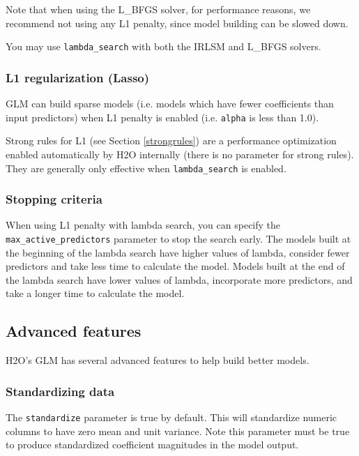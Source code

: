 Note that when using the L\_BFGS solver, for performance reasons, we recommend not using any L1 penalty, since
model building can be slowed down.

You may use \texttt{lambda\_search} with both the IRLSM and L\_BFGS solvers.

\subsubsection{L1 regularization (Lasso)}

GLM can build sparse models (i.e. models which have fewer coefficients than input predictors) when L1 penalty is
enabled (i.e. \texttt{alpha} is less than 1.0).

Strong rules for L1 (see Section \ref{strongrules}) are a performance optimization enabled automatically by H2O
internally (there is no parameter for strong rules).  They are generally only effective when
\texttt{lambda\_search} is enabled.

\subsubsection{Stopping criteria}

When using L1 penalty with lambda search, you can specify the \texttt{max\_active\_predictors} parameter to stop
the search early.  The models built at the beginning of the lambda search have higher values of lambda, consider
fewer predictors and take less time to calculate the model.  Models built at the end of the lambda search have
lower values of lambda, incorporate more predictors, and take a longer time to calculate the model.

\bigskip
\waterExampleInR


\subsection{Advanced features}

H2O's GLM has several advanced features to help build better models.

\subsubsection{Standardizing data}

The \texttt{standardize} parameter is true by default.  This will standardize numeric columns to have zero mean and
unit variance.  Note this parameter must be true to produce standardized coefficient magnitudes in the model
output.

